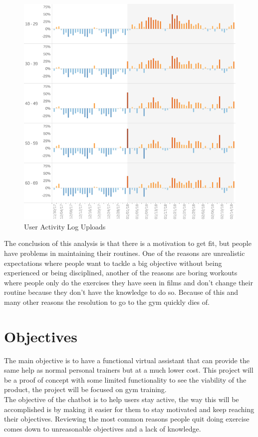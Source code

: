 \begin{center}
	\begin{figure}[h!]
		\centering
		\includegraphics[scale=0.6]{./images/2-new-year-logs}
		\caption{User Activity Log Uploads}
		\label{user-logs-gym}
	\end{figure}
\end{center}

The conclusion of this analysis is that there is a motivation to get fit, but people have problems in maintaining their routines.  One of the reasons are unrealistic expectations where people want to tackle a big objective without being experienced or being disciplined, another of the reasons are boring workouts where people only do the exercises they have seen in films and don’t change their routine because they don’t have the knowledge to do so. Because of this and many other reasons the resolution to go to the gym quickly dies of.\cite{newyear_logs}\\

\section{Objectives}\label{sec:chap2_objectives}

The main objective is to have a functional virtual assistant that can provide the same help as normal personal trainers but at a much lower cost. This project will be a proof of concept with some limited functionality to see the viability of the product, the project will be focused on gym training.\\
The objective of the chatbot is to help users stay active, the way this will be accomplished is by making it easier for them to stay motivated and keep reaching their objectives. Reviewing the most common reasons people quit doing exercise comes down to unreasonable objectives and a lack of knowledge.\\

